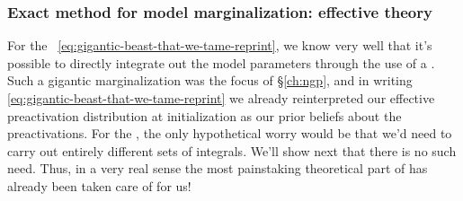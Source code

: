 \subsubsection{Exact method for model marginalization: effective theory}
For the ~\eqref{eq:gigantic-beast-that-we-tame-reprint}, we know very well that it's possible to directly integrate out the model parameters through the use of a . 
Such a gigantic marginalization was the focus of \S\ref{ch:ngp}, and in writing \eqref{eq:gigantic-beast-that-we-tame-reprint} we already reinterpreted our effective preactivation distribution at initialization as our prior beliefs about the preactivations.
For the , the only hypothetical worry would be that we'd need to carry out entirely different sets of integrals. We'll show next that there is no such need.
Thus, in a very real sense the most painstaking theoretical part of  has already been taken care of for us!


